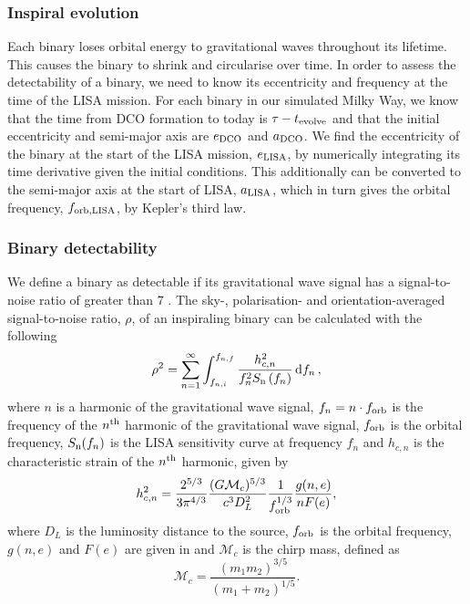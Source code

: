 \subsubsection{Inspiral evolution}

Each binary loses orbital energy to gravitational waves throughout its lifetime. This causes the binary to shrink and circularise over time. In order to assess the detectability of a binary, we need to know its eccentricity and frequency at the time of the LISA mission. For each binary in our simulated Milky Way, we know that the time from DCO formation to today is $\tau - t_{\rm evolve}$ and that the initial eccentricity and semi-major axis are $e_{\rm DCO}$ and $a_{\rm DCO}$. We find the eccentricity of the binary at the start of the LISA mission, $e_{\rm LISA}$, by numerically integrating its time derivative \citep[][Eq. 5.13]{Peters+1964} given the initial conditions. This additionally can be converted to the semi-major axis at the start of LISA, $a_{\rm LISA} $\citep[][Eq. 5.11]{Peters+1964}, which in turn gives the orbital frequency, $f_{\rm orb, LISA}$, by Kepler's third law.

\subsubsection{Binary detectability}

We define a binary as detectable if its gravitational wave signal has a signal-to-noise ratio of greater than 7 \citep[e.g.][]{Breivik+2020, Korol+2020}. The sky-, polarisation- and orientation-averaged signal-to-noise ratio, $\rho$, of an inspiraling binary can be calculated with the following \citep[e.g.][]{Finn+2000}
\begin{equation}\label{eq:snr}
    \rho^2 = \sum_{n=1}^{\infty} \int_{f_{n, i}}^{f_{n, f}} \frac{h_{c, n}^{2}}{f_{n}^{2} S_{\rm n}\left(f_{n}\right)} \dd{f_n},
\end{equation}
where $n$ is a harmonic of the gravitational wave signal, $f_n = n \cdot f_{\rm orb}$ is the frequency of the $n^{\rm th}$ harmonic of the gravitational wave signal, $f_{\rm orb}$ is the orbital frequency, $S_{\rm n}(f_n)$ is the LISA sensitivity curve at frequency $f_n$ \citep[e.g.][]{Robson+2019} and $h_{c,n}$ is the characteristic strain of the $n^{\rm th}$ harmonic, given by \citep[e.g.][]{Barack+2004}
\begin{equation}\label{eq:charstrain}
    h^2_{c,n} = \frac{2^{5/3}}{3 \pi^{4/3}} \frac{(G \mathcal{M}_c)^{5/3}}{c^3 D_L^2} \frac{1}{f_{\rm orb}^{1/3}} \frac{g(n,e)}{n F(e)},
\end{equation}
where $D_L$ is the luminosity distance to the source, $f_{\rm orb}$ is the orbital frequency, $g(n, e)$ and $F(e)$ are given in \citet{Peters+1963} and $\mathcal{M}_c$ is the chirp mass, defined as
\begin{equation}\label{eq:chirp_mass}
    \mathcal{M}_c = \frac{(m_1 m_2)^{3/5}}{(m_1 + m_2)^{1/5}}.
\end{equation}

